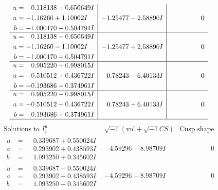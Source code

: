 \documentclass[1p]{elsarticle_modified}
\theoremstyle{definition}
\newcommand{\I}{\sqrt{-1}}
\begin{document}
$$\begin{array}{c|c|c}
\begin{aligned}
u &= \phantom{-}0.118138 + 0.650649 I \\
a &= -1.16260 + 1.10002 I \\
b &= -1.000170 - 0.504791 I\end{aligned}
 & -1.25477 - 2.58890 I & \phantom{-0.000000 } 0 \\ \hline\begin{aligned}
u &= \phantom{-}0.118138 - 0.650649 I \\
a &= -1.16260 - 1.10002 I \\
b &= -1.000170 + 0.504791 I\end{aligned}
 & -1.25477 + 2.58890 I & \phantom{-0.000000 } 0 \\ \hline\begin{aligned}
u &= \phantom{-}0.905220 + 0.998015 I \\
a &= -0.510512 + 0.436722 I \\
b &= -0.193686 - 0.374961 I\end{aligned}
 & \phantom{-}0.78243 - 6.40133 I & \phantom{-0.000000 } 0 \\ \hline\begin{aligned}
u &= \phantom{-}0.905220 - 0.998015 I \\
a &= -0.510512 - 0.436722 I \\
b &= -0.193686 + 0.374961 I\end{aligned}
 & \phantom{-}0.78243 + 6.40133 I & \phantom{-0.000000 } 0\\
 \hline 
 \end{array}$$\newpage$$\begin{array}{c|c|c}  
\text{Solutions to }I^u_{1}& \I (\text{vol} + \sqrt{-1}CS) & \text{Cusp shape}\\
 \hline 
\begin{aligned}
u &= \phantom{-}0.339687 + 0.550024 I \\
a &= \phantom{-}0.293902 + 0.438593 I \\
b &= \phantom{-}1.093250 + 0.345602 I\end{aligned}
 & -4.59296 - 8.98709 I & \phantom{-0.000000 } 0 \\ \hline\begin{aligned}
u &= \phantom{-}0.339687 - 0.550024 I \\
a &= \phantom{-}0.293902 - 0.438593 I \\
b &= \phantom{-}1.093250 - 0.345602 I\end{aligned}
 & -4.59296 + 8.98709 I & \phantom{-0.000000 } 0 \\ \hline\begin{aligned}

\end{aligned}
\end{array}$$
\end{document}
